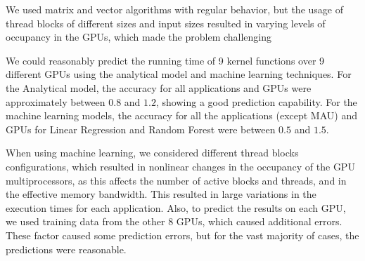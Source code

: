 We used matrix and vector algorithms with regular behavior, but the usage of thread blocks of different sizes and input sizes resulted in varying levels of occupancy in the GPUs, which made the problem challenging

We could reasonably predict the running time of 9 kernel functions over 9 different GPUs using the analytical model and machine learning techniques. For the Analytical model, the accuracy for all applications and GPUs were approximately between $0.8$ and $1.2$, showing a good prediction capability. For the machine learning models, the accuracy for all the applications (except MAU) and GPUs for Linear Regression and Random Forest were between $0.5$ and $1.5$.

When using machine learning, we considered different thread blocks configurations, which resulted in nonlinear changes in the occupancy of the GPU multiprocessors, as this affects the number of active blocks and threads, and in the effective memory bandwidth. This resulted in large variations in the execution times for each application. Also, to predict the results on each GPU, we used training data from the other 8 GPUs, which caused additional errors. These factor caused some prediction errors, but for the vast majority of cases, the predictions were reasonable.


